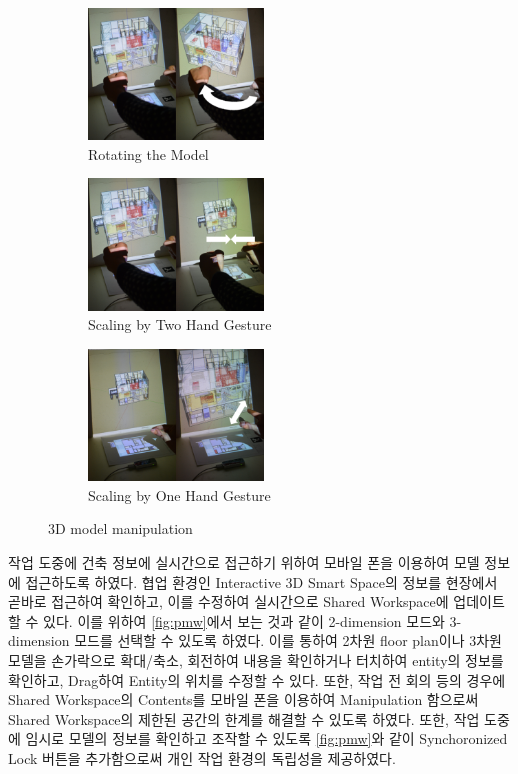 \begin{figure}[t!]
    \centering
        \begin{subfigure}[b]{0.32\textwidth}
            \centering
                \includegraphics[width=\textwidth, height=3.5cm]{4-Interaction_Design/3d_rotation_1}
                \caption{Rotating the Model}
                \label{fig:rotate}
        \end{subfigure}%
        \hfill
        \begin{subfigure}[b]{0.32\textwidth}
            \centering
            \includegraphics[width=\textwidth, height=3.5cm]{4-Interaction_Design/3d_scale}
                \caption{Scaling by Two Hand Gesture}
                \label{fig:scale_two_hand}
        \end{subfigure}
        \hfill
        \begin{subfigure}[b]{0.32\textwidth}
            \centering
            \includegraphics[width=\textwidth, height=3.5cm]{4-Interaction_Design/3d_scale_pinch}
                \caption{Scaling by One Hand Gesture}
                \label{fig:scale_pinch}
        \end{subfigure}
    \caption{3D model manipulation}
    \label{fig:3d_mani}
\end{figure}

작업 도중에 건축 정보에 실시간으로 접근하기 위하여 모바일 폰을 이용하여 모델 정보에 접근하도록 하였다. 협업 환경인 Interactive 3D Smart Space의 정보를 현장에서 곧바로 접근하여 확인하고, 이를 수정하여 실시간으로 Shared Workspace에 업데이트할 수 있다. 이를 위하여 \ref{fig:pmw}에서 보는 것과 같이 2-dimension 모드와 3-dimension 모드를 선택할 수 있도록 하였다. 이를 통하여 2차원 floor plan이나 3차원 모델을 손가락으로 확대/축소, 회전하여 내용을 확인하거나 터치하여 entity의 정보를 확인하고, Drag하여 Entity의 위치를 수정할 수 있다. 또한, 작업 전 회의 등의 경우에 Shared Workspace의 Contents를 모바일 폰을 이용하여 Manipulation 함으로써 Shared Workspace의 제한된 공간의 한계를 해결할 수 있도록 하였다. 또한, 작업 도중에 임시로 모델의 정보를 확인하고 조작할 수 있도록 \ref{fig:pmw}와 같이 Synchoronized Lock 버튼을 추가함으로써 개인 작업 환경의 독립성을 제공하였다. 

